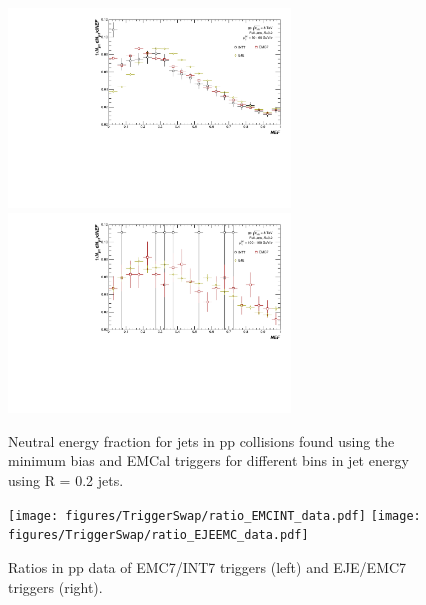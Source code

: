 \documentclass[ALICE]{ALICE_analysis_notes}
\newcommand{\pp}{pp\xspace}
\begin{document}
\begin{figure}[h!]
\begin{multicols}{2}
        \vfill\null
        \columnbreak
            \includegraphics[width=7.5cm]{figures/NEF/All/hNEF_30-60GeV_R02.pdf}
            \includegraphics[width=7.5cm]{figures/NEF/All/hNEF_100-160GeV_R02.pdf}
        \vfill\null
    \end{multicols}
    \caption{Neutral energy fraction for jets in \pp collisions found using the minimum bias and EMCal triggers for different bins in jet energy using R = 0.2 jets.}
    \label{fig:NEF}
\end{figure}

\begin{figure}[h!]
    \centering
    \begin{multicols}{2}
            \texttt{[image: figures/TriggerSwap/ratio\_EMCINT\_data.pdf]}
        \vfill\null 
        \columnbreak
            \texttt{[image: figures/TriggerSwap/ratio\_EJEEMC\_data.pdf]}
        \vfill\null
    \end{multicols}
    \caption{Ratios in \pp data of EMC7/INT7 triggers (left) and EJE/EMC7 triggers (right).}
    \label{fig:trigger_ratios}
\end{figure}
\end{document}
